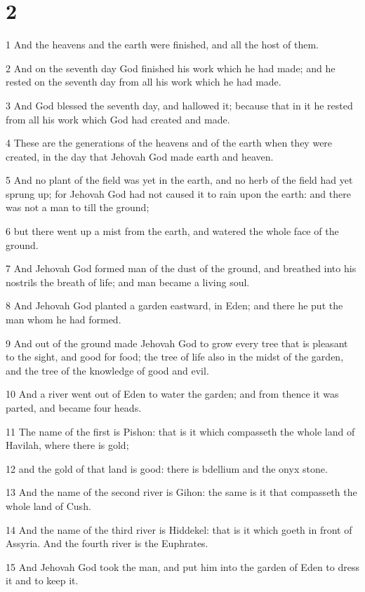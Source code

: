 \chapter{2}

\par 1 And the heavens and the earth were finished, and all the host of them.
\par 2 And on the seventh day God finished his work which he had made; and he rested on the seventh day from all his work which he had made.
\par 3 And God blessed the seventh day, and hallowed it; because that in it he rested from all his work which God had created and made.
\par 4 These are the generations of the heavens and of the earth when they were created, in the day that Jehovah God made earth and heaven.
\par 5 And no plant of the field was yet in the earth, and no herb of the field had yet sprung up; for Jehovah God had not caused it to rain upon the earth: and there was not a man to till the ground;
\par 6 but there went up a mist from the earth, and watered the whole face of the ground.
\par 7 And Jehovah God formed man of the dust of the ground, and breathed into his nostrils the breath of life; and man became a living soul.
\par 8 And Jehovah God planted a garden eastward, in Eden; and there he put the man whom he had formed.
\par 9 And out of the ground made Jehovah God to grow every tree that is pleasant to the sight, and good for food; the tree of life also in the midst of the garden, and the tree of the knowledge of good and evil.
\par 10 And a river went out of Eden to water the garden; and from thence it was parted, and became four heads.
\par 11 The name of the first is Pishon: that is it which compasseth the whole land of Havilah, where there is gold;
\par 12 and the gold of that land is good: there is bdellium and the onyx stone.
\par 13 And the name of the second river is Gihon: the same is it that compasseth the whole land of Cush.
\par 14 And the name of the third river is Hiddekel: that is it which goeth in front of Assyria. And the fourth river is the Euphrates.
\par 15 And Jehovah God took the man, and put him into the garden of Eden to dress it and to keep it.
